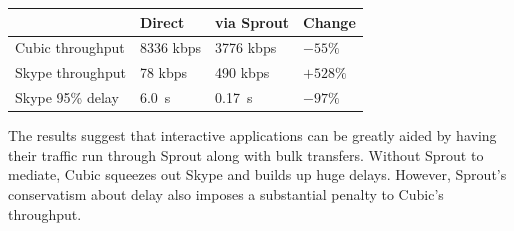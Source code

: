 \vspace{\baselineskip}

{
\small
\noindent \begin{tabular}{|l|l|l|l|}
\hline
& Direct & via Sprout & Change \\
\hline
\hline
Cubic throughput & 8336 kbps & 3776 kbps & \cellcolor{red!20}$-55\%$ \\
Skype throughput & 78 kbps & 490 kbps & \cellcolor{blue!20}$+528\%$ \\
Skype 95\% delay & 6.0~s & 0.17~s & \cellcolor{blue!20}$-97\%$ \\
\hline
\end{tabular}
}
\vspace{\baselineskip}

The results suggest that interactive applications can be
greatly aided by having their traffic run through Sprout along
with bulk transfers. Without Sprout to mediate, Cubic squeezes
out Skype and builds up huge delays. However, Sprout's conservatism about
delay also imposes a substantial penalty to Cubic's throughput.

\vspace{\baselineskip}








